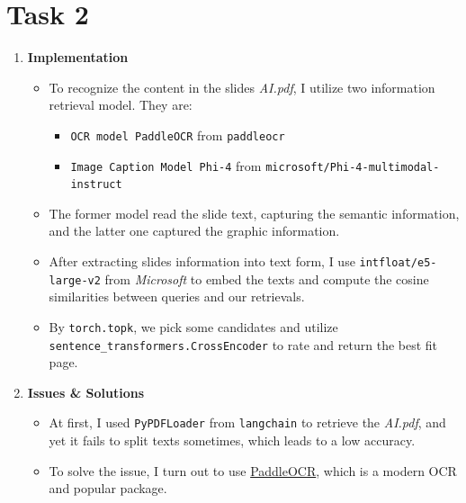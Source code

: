 \documentclass{article}
\begin{document}

\section*{Task 2}

\begin{enumerate}[leftmargin=*]

\item \textbf{Implementation}

\begin{itemize}
	\item To recognize the content in the slides \textit{AI.pdf}, I utilize two information retrieval model. They are:
		\begin{itemize}
			\item \texttt{OCR model PaddleOCR} from \texttt{paddleocr}
			\item \texttt{Image Caption Model Phi-4} from \texttt{microsoft/Phi-4-multimodal-instruct}
		\end{itemize}
	\item The former model read the slide text, capturing the semantic information, and the latter one captured the graphic information.
	\item After extracting slides information into text form, I use \texttt{intfloat/e5-large-v2} from \textit{Microsoft} to embed the texts and compute the cosine similarities between queries and our retrievals. 
	\item By \texttt{torch.topk}, we pick some candidates and utilize \texttt{sentence\_transformers.CrossEncoder} to rate and return the best fit page.
\end{itemize}

\item \textbf{Issues \& Solutions}

\begin{itemize}
	\item At first, I used \texttt{PyPDFLoader} from \texttt{langchain} to retrieve the \textit{AI.pdf}, and yet it fails to split texts sometimes, which leads to a low accuracy. 
	\item To solve the issue, I turn out to use \href{https://github.com/PaddlePaddle/PaddleOCR}{PaddleOCR}, which is a modern OCR and popular package.
\end{itemize}


\end {enumerate}
\end{document}
